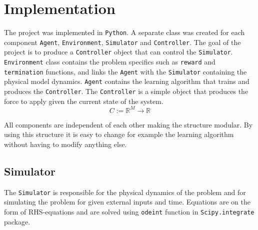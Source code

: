 \documentclass{LTHtwocol} %
\begin{document}
%

\section{Implementation}
The project was implemented in \texttt{Python}.
A separate class was created for each component \texttt{Agent}, \texttt{Environment}, \texttt{Simulator} and \texttt{Controller}.
The goal of the project is to produce a \texttt{Controller} object that can control the \texttt{Simulator}.
\texttt{Environment} class contains the problem specifics such as \texttt{reward} and \texttt{termination} functions, and links the \texttt{Agent} with the \texttt{Simulator} containing the physical model dynamics.
\texttt{Agent} contains the learning algorithm that trains and produces the \texttt{Controller}.
The \texttt{Controller} is a simple object that produces the force to apply given the current state of the system.
\begin{equation}
	C := \mathbb{R}^M \to \mathbb{R}
\end{equation}

All components are independent of each other making the structure modular.
By using this structure it is easy to change for example the learning algorithm without having to modify anything else.

\subsection{Simulator}
The \texttt{Simulator} is responsible for the physical dynamics of the problem and for simulating the problem for given external inputs and time.
Equations are on the form of RHS-equations and are solved using \texttt{odeint} function in \texttt{Scipy.integrate} package.
\end{document}
